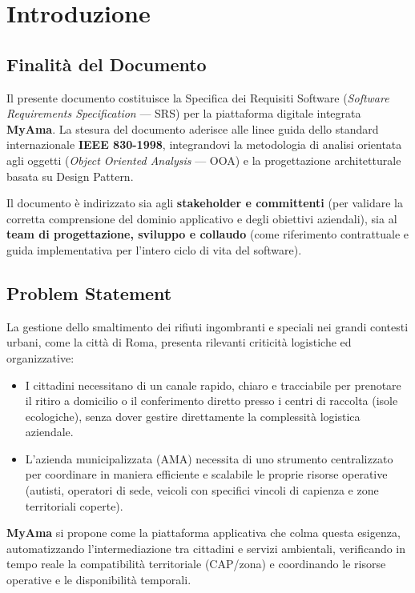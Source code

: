 \section{Introduzione}

\subsection{Finalità del Documento}
Il presente documento costituisce la Specifica dei Requisiti Software (\textit{Software Requirements Specification} --- SRS) per la piattaforma digitale integrata \textbf{MyAma}. La stesura del documento aderisce alle linee guida dello standard internazionale \textbf{IEEE 830-1998}, integrandovi la metodologia di analisi orientata agli oggetti (\textit{Object Oriented Analysis} --- OOA) e la progettazione architetturale basata su Design Pattern.

Il documento è indirizzato sia agli \textbf{stakeholder e committenti} (per validare la corretta comprensione del dominio applicativo e degli obiettivi aziendali), sia al \textbf{team di progettazione, sviluppo e collaudo} (come riferimento contrattuale e guida implementativa per l'intero ciclo di vita del software).

\subsection{Problem Statement}
La gestione dello smaltimento dei rifiuti ingombranti e speciali nei grandi contesti urbani, come la città di Roma, presenta rilevanti criticità logistiche ed organizzative:
\begin{itemize}
    \item I cittadini necessitano di un canale rapido, chiaro e tracciabile per prenotare il ritiro a domicilio o il conferimento diretto presso i centri di raccolta (isole ecologiche), senza dover gestire direttamente la complessità logistica aziendale.
    \item L'azienda municipalizzata (AMA) necessita di uno strumento centralizzato per coordinare in maniera efficiente e scalabile le proprie risorse operative (autisti, operatori di sede, veicoli con specifici vincoli di capienza e zone territoriali coperte).
\end{itemize}

\textbf{MyAma} si propone come la piattaforma applicativa che colma questa esigenza, automatizzando l'intermediazione tra cittadini e servizi ambientali, verificando in tempo reale la compatibilità territoriale (CAP/zona) e coordinando le risorse operative e le disponibilità temporali.


